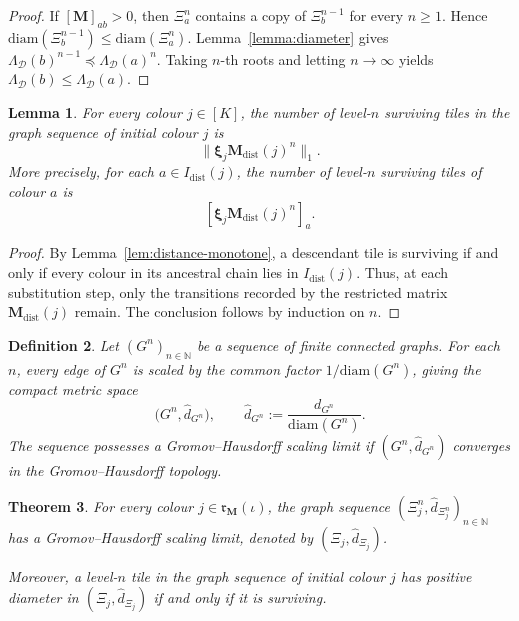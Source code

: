 \documentclass[12pt]{iopart}
\newtheorem{theorem}{Theorem}[section]
\newtheorem{lemma}[theorem]{Lemma}
\newtheorem{definition}[theorem]{Definition}
\newcommand*{\dist}{d}
\newcommand*{\bbbxi}{\boldsymbol{\xi}}
\newcommand*{\diam}{\mathrm{diam}}
\begin{document}
\begin{proof}
If $[\mathbf M]_{ab}>0$, then $\Xi_a^n$ contains a copy of $\Xi_b^{n-1}$ for every $n\ge 1$.
Hence $\diam(\Xi_b^{n-1})\le \diam(\Xi_a^n)$.
Lemma~\ref{lemma:diameter} gives
$\Lambda_{\mathcal D}(b)^{n-1}\preceq \Lambda_{\mathcal D}(a)^n$.
Taking $n$-th roots and letting $n\to\infty$ yields
$\Lambda_{\mathcal D}(b)\le \Lambda_{\mathcal D}(a)$.
\end{proof}

\begin{lemma}\label{lem:surviving-tile-count}
For every colour $j\in[K]$, the number of level-$n$ surviving tiles in the graph sequence of initial colour $j$ is
\[
\big\|
\bbbxi_j\mathbf M_{\mathrm{dist}}(j)^n
\big\|_1.
\]
More precisely, for each $a\in I_{\mathrm{dist}}(j)$, the number of level-$n$ surviving tiles of colour $a$ is
\[
[\bbbxi_j\mathbf M_{\mathrm{dist}}(j)^n]_a.
\]
\end{lemma}

\begin{proof}
By Lemma~\ref{lem:distance-monotone}, a descendant tile is surviving if and only if every colour in its ancestral chain lies in $I_{\mathrm{dist}}(j)$.
Thus, at each substitution step, only the transitions recorded by the restricted matrix $\mathbf M_{\mathrm{dist}}(j)$ remain.
The conclusion follows by induction on $n$.
\end{proof}

\begin{definition}\label{def:GH-scaling-limit}
Let $(G^n)_{n\in\mathbb N}$ be a sequence of finite connected graphs.
For each $n$, every edge of $G^n$ is scaled by the common factor $1/\diam(G^n)$, giving the compact metric space
\[
\big(G^n,\hat\dist_{G^n}\big),
\qquad
\hat\dist_{G^n}:=\frac{\dist_{G^n}}{\diam(G^n)}.
\]
The sequence possesses a Gromov--Hausdorff scaling limit if $(G^n,\hat\dist_{G^n})$ converges in the Gromov--Hausdorff topology.
\end{definition}

\begin{theorem}\label{thm:GH-limit}
For every colour $j\in\mathfrak r_{\mathbf M}(\iota)$, the graph sequence
$(\Xi_j^n,\hat\dist_{\Xi_j^n})_{n\in\mathbb N}$ has a Gromov--Hausdorff scaling limit, denoted by
$(\Xi_j,\hat\dist_{\Xi_j})$.

Moreover, a level-$n$ tile in the graph sequence of initial colour $j$ has positive diameter in
$(\Xi_j,\hat\dist_{\Xi_j})$ if and only if it is surviving.
\end{theorem}
\end{document}
